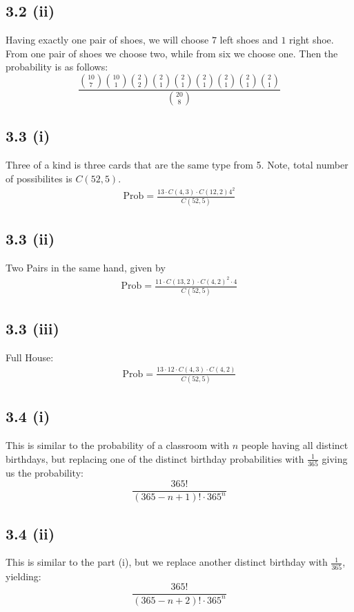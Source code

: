 \documentclass[letterpaper,12pt]{article}
\theoremstyle{definition}
\begin{document}
\subsection*{3.2 (ii)}
Having exactly one pair of shoes, we will choose $7$ left shoes and $1$ right shoe. From one pair of shoes we choose two, while from six we choose one. Then the probability is as follows:
\[  \frac{\binom{10}{7} \binom{10}{1} \binom22  \binom21 \binom21 \binom21 \binom21 \binom21 \binom21   }{\binom{20}{8}}  \]

\subsection*{3.3 (i)}


Three of a kind is three cards that are the same type from 5. Note, total number of possibilites is $C(52,5)$.\\
\begin{align*}
    \text{Prob} = \frac{13\cdot C(4,3) \cdot C(12,2) 4^2}{C(52,5)}
\end{align*}
\subsection*{3.3 (ii)}
Two Pairs in the same hand, given by
\begin{align*}
    \text{Prob} = \frac{11\cdot C(13,2) \cdot C(4,2)^2 \cdot 4}{C(52,5)}
\end{align*}


\subsection*{3.3 (iii)}

Full House:
\begin{align*}
    \text{Prob} = \frac{ 13 \cdot 12 \cdot  C(4,3) \cdot C(4,2)}{ C(52,5)}
\end{align*}


\subsection*{3.4 (i)}


This is similar to the probability of a classroom with $n$ people having all distinct birthdays, but replacing one of the distinct birthday probabilities with $\frac{1}{365}$ giving us the probability:
\[ \frac{365!}{(365-n+1)! \cdot 365^n}\]
\subsection*{3.4 (ii)}
This is similar to the part (i), but we replace another distinct birthday with $\frac{1}{365}$, yielding:
\[ \frac{365!}{(365-n+2)! \cdot 365^{n}}\]
\end{document}
